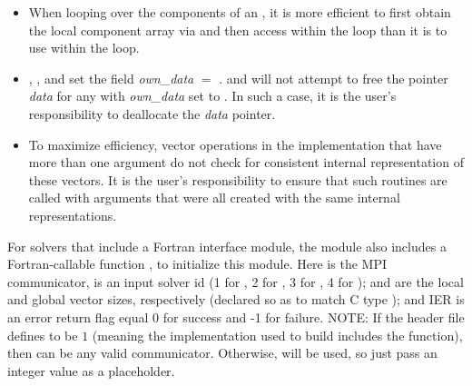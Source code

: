 \begin{itemize}
                                        
\item
  When looping over the components of an  , it is     
  more efficient to first obtain the local component array via       
   and then access  within the     
  loop than it is to use  within the loop.        
                                                               
\item
  {\warn}, , 
  and  set the field 
  {\em own\_data} $=$ . 
   and 
  will not attempt to free the pointer {\em data} for any  with
  {\em own\_data} set to . In such a case, it is the user's responsibility to
  deallocate the {\em data} pointer.

\item
  {\warn}To maximize efficiency, vector operations in the {\nvecp} implementation
  that have more than one  argument do not check for
  consistent internal representation of these vectors. It is the user's 
  responsibility to ensure that such routines are called with 
  arguments that were all created with the same internal representations.

\end{itemize}

For solvers that include a Fortran interface module, the {\nvecp} module
also includes a Fortran-callable function
,
to initialize this {\nvecp} module.  Here  is the MPI communicator,
 is an input solver id (1 for {\cvode}, 2 for {\ida}, 3 for {\kinsol},
4 for {\arkode});  and  are the local and global
vector sizes, respectively (declared so as to match C type );
and IER is an error return flag equal 0 for success and -1 for failure.
{\warn}NOTE: If the header file  defines
 to be $1$ (meaning the {\mpi}
implementation used to build {\sundials} includes the
 function), then  can be any valid
{\mpi} communicator. Otherwise,  will be used, so
just pass an integer value as a placeholder.
